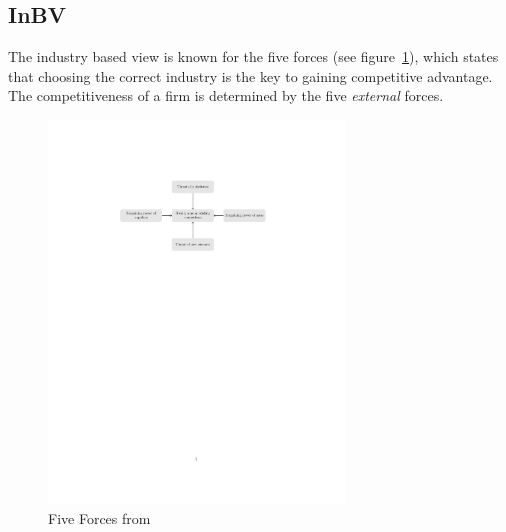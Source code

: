 \subsection{\glsdesc{InBV}} %
The industry based view is known for the five forces (see figure~\ref{fig:5forces}), which states that choosing the correct industry is the key to gaining competitive advantage. The competitiveness of a firm is determined by the five \emph{external} forces.

\begin{figure}[htbp]%
       \centering%
	\includegraphics[width=0.7\textwidth]{5forces}%
 	\caption{Five Forces from~\cite{Porter:1980}}%
 	\label{fig:5forces}%
\end{figure}
